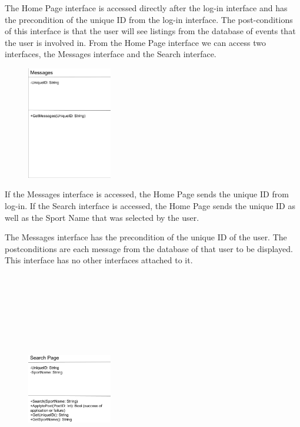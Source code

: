 \documentclass[a4paper]{article}
\begin{document}
The Home Page interface is accessed directly after the log-in interface and has the precondition of the unique ID from the log-in interface.  
The post-conditions of this interface is that the user will see listings from the database of events that the user is involved in. 
From the Home Page interface we can access two interfaces, the Messages interface and the Search interface. 
\clearpage
\begin{figure}
   \centering
   \includegraphics[width=0.33\textwidth]{Messages.eps}
\end{figure}

If the Messages interface is accessed, the Home Page sends the unique ID from log-in. 
If the Search interface is accessed, the Home Page sends the unique ID as well as the Sport Name that was selected by the user.

The Messages interface has the precondition of the unique ID of the user. 
The postconditions are each message from the database of that user to be displayed. 
This interface has no other interfaces attached to it.\\
\\\\\\\\\\\\\\
\begin{figure}
   \centering
   \includegraphics[width=0.33\textwidth]{SearchPage.eps}
\end{figure}
\end{document}
